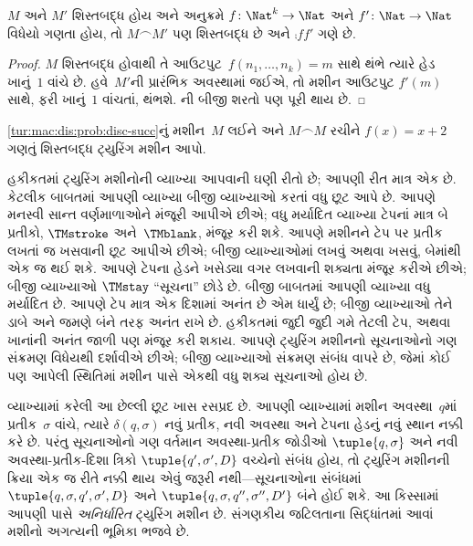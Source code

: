 \begin{prop}
    $M$ અને $M'$ શિસ્તબદ્ધ હોય અને અનુક્રમે
    $f\colon \Nat^k \to \Nat$ અને
    $f'\colon \Nat \to \Nat$ વિધેયો ગણતા હોય, તો
    $M \frown M'$ પણ શિસ્તબદ્ધ છે અને
    $\comp{f}{f'}$ ગણે છે.
\end{prop}

\begin{proof}
    $M$ શિસ્તબદ્ધ હોવાથી તે
    આઉટપુટ~$f(n_1,\dots,n_k) = m$ સાથે થંભે ત્યારે
    હેડ ખાનું~$1$ વાંચે છે. હવે~$M'$ની પ્રારંભિક
    અવસ્થામાં જઈએ, તો મશીન આઉટપુટ $f'(m)$ સાથે,
    ફરી ખાનું~$1$ વાંચતાં, થંભશે.
    ની બીજી શરતો પણ
    પૂરી થાય છે.
\end{proof}

\begin{prob}
    \cref{tur:mac:dis:prob:disc-succ}નું મશીન~$M$
    લઈને અને $M \frown M$ રચીને $f(x) = x+2$
    ગણતું શિસ્તબદ્ધ ટ્યુરિંગ મશીન આપો.
\end{prob}
\endgroup


\begingroup
\makeatletter{}\makeatother

\label{guunit:OLP-0262}


હકીકતમાં ટ્યુરિંગ મશીનોની વ્યાખ્યા આપવાની ઘણી રીતો છે;
આપણી રીત માત્ર એક છે. કેટલીક બાબતમાં આપણી વ્યાખ્યા
બીજી વ્યાખ્યાઓ કરતાં વધુ છૂટ આપે છે. આપણે મનસ્વી
સાન્ત વર્ણમાળાઓને મંજૂરી આપીએ છીએ; વધુ મર્યાદિત
વ્યાખ્યા ટેપનાં માત્ર બે પ્રતીકો, $\TMstroke$ અને~$\TMblank$,
મંજૂર કરી શકે. આપણે મશીનને ટેપ પર પ્રતીક લખતાં જ
ખસવાની છૂટ આપીએ છીએ; બીજી વ્યાખ્યાઓમાં લખવું
અથવા ખસવું, બેમાંથી એક જ થઈ શકે. આપણે ટેપના હેડને
ખસેડ્યા વગર લખવાની શક્યતા મંજૂર કરીએ છીએ; બીજી
વ્યાખ્યાઓ $\TMstay$ ``સૂચના'' છોડે છે. બીજી બાબતમાં
આપણી વ્યાખ્યા વધુ મર્યાદિત છે. આપણે ટેપ માત્ર એક
દિશામાં અનંત છે એમ ધાર્યું છે; બીજી વ્યાખ્યાઓ તેને ડાબે
અને જમણે બંને તરફ અનંત રાખે છે. હકીકતમાં જુદી જુદી
ગમે તેટલી ટેપ, અથવા ખાનાંની અનંત જાળી પણ મંજૂર કરી
શકાય. આપણે ટ્યુરિંગ મશીનનો સૂચનાઓનો ગણ સંક્રમણ
વિધેયથી દર્શાવીએ છીએ; બીજી વ્યાખ્યાઓ સંક્રમણ સંબંધ
વાપરે છે, જેમાં કોઈ પણ આપેલી સ્થિતિમાં મશીન પાસે
એકથી વધુ શક્ય સૂચનાઓ હોય છે.

વ્યાખ્યામાં કરેલી આ છેલ્લી છૂટ ખાસ રસપ્રદ છે. આપણી
વ્યાખ્યામાં મશીન અવસ્થા~$q$માં પ્રતીક~$\sigma$ વાંચે,
ત્યારે $\delta(q, \sigma)$ નવું પ્રતીક, નવી અવસ્થા અને
ટેપના હેડનું નવું સ્થાન નક્કી કરે છે. પરંતુ સૂચનાઓનો
ગણ વર્તમાન અવસ્થા-પ્રતીક જોડીઓ $\tuple{q,
  \sigma}$ અને નવી અવસ્થા-પ્રતીક-દિશા ત્રિકો
$\tuple{q', \sigma',
  D}$ વચ્ચેનો સંબંધ હોય, તો ટ્યુરિંગ મશીનની ક્રિયા
એક જ રીતે નક્કી થાય એવું જરૂરી નથી---સૂચનાઓના
સંબંધમાં $\tuple{q,
  \sigma, q', \sigma', D}$ અને
$\tuple{q, \sigma, q'', \sigma'', D'}$ બંને હોઈ શકે.
આ કિસ્સામાં આપણી પાસે \emph{અનિર્ધારિત} ટ્યુરિંગ મશીન
છે. સંગણકીય જટિલતાના સિદ્ધાંતમાં આવાં મશીનો અગત્યની
ભૂમિકા ભજવે છે.

